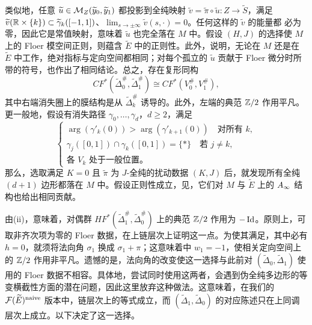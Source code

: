 类似地，任意 $\widetilde u\in\mathcal M_Z(\widetilde y_0,\widetilde y_1)$ 都投影到全纯映射 $\widetilde v=\widetilde\pi\circ\widetilde u:Z\to\widetilde S$，满足 $\widetilde v(\mathbb R\times\{k\})\subset\widetilde\gamma_k([-1,1])$、$\lim_{s\to\pm\infty}\widetilde v(s,\cdot)=0$。任何这样的 $\widetilde v$ 的能量都
必为零，因此它是常值映射，意味着 $\widetilde u$ 也完全落在 $M$ 中。假设 $(H,J)$ 的选择使 $M$ 上的 Floer 模空间正则，则蕴含 $\widetilde E$ 中的正则性。此外，说明，无论在 $M$ 还是在 $\widetilde E$ 中工作，绝对指标与定向空间都相同；对每个孤立的 $\widetilde u$ 贡献于 Floer 微分时所带的符号，也作出了相同结论。总之，存在复形同构
\begin{equation}\label{eq:18.23}
CF^*(\widetilde\Delta_0^\#,\widetilde\Delta_1^\#)\cong CF^*(V_0^\#,V_1^\#),
\end{equation}
其中右端消失圈上的膜结构是从 $\widetilde\Delta_k^\#$ 诱导的。此外，左端的典范 $\mathbb Z/2$ 作用平凡。更一般地，假设有消失路径 $\gamma_0,\ldots,\gamma_d$，$d\ge2$，满足
\begin{equation}\label{eq:18.24}
\begin{cases}
\arg(\gamma'_k(0))>\arg(\gamma'_{k+1}(0))\quad\text{对所有 }k,\\
\gamma_j([0,1])\cap\gamma_k([0,1])=\{*\}\quad\text{若 }j\ne k,\\
\text{各 $V_k$ 处于一般位置。}
\end{cases}
\end{equation}
那么，选取满足 $K=0$ 且 $\widetilde\pi$ 为 $J$-全纯的扰动数据 $(K,J)$ 后，就发现所有全纯 $(d+1)$ 边形都落在 $M$ 中。假设正则性成立，见，它们对 $M$ 与 $\widetilde E$ 上的 $A_\infty$ 结构也给出相同贡献。

\begin{note}\label{st:18.10}
由(ii)，意味着，对偶群 $HF^*(\widetilde\Delta_1^\#,\widetilde\Delta_0^\#)$ 上的典范 $\mathbb Z/2$ 作用为 $-\operatorname{Id}$。原则上，可取非齐次项为零的 Floer 数据，在上链层次上证明这一点。为使其满足，其中必有 $h=0$，就须将法向角 $\sigma_1$ 换成 $\sigma_1+\pi$；这意味着中 $w_1=-1$，使相关定向空间上的 $\mathbb Z/2$ 作用非平凡。遗憾的是，法向角的改变使这一选择与此前对 $(\widetilde\Delta_0,\widetilde\Delta_1)$ 使用的 Floer 数据不相容。具体地，尝试同时使用这两者，会遇到伪全纯多边形的等变横截性方面的潜在问题，因此这里放弃这种做法。这意味着，在我们的 $\mathcal F(\widetilde E)^{\mathrm{naive}}$ 版本中，链层次上的等式成立，而 $(\widetilde\Delta_1,\widetilde\Delta_0)$ 的对应陈述只在上同调层次上成立。以下决定了这一选择。
\end{note}

